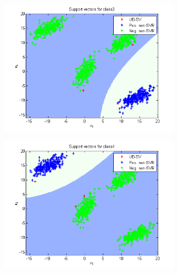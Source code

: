 \documentclass{article}
\begin{document}
\begin{figure}
\begin{subfigure}{.5\textwidth}
  \centering
  \includegraphics[width=.8\linewidth]{Classification/1a/c_poly/sv3}
 
\end{subfigure}%
\begin{subfigure}{.5\textwidth}
  \centering
  \includegraphics[width=.8\linewidth]{Classification/1a/c_poly/sv4}
  
\end{subfigure}
\end{figure}
\end{document}

